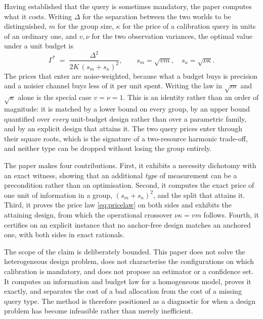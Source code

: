 Having established that the query is sometimes mandatory, the paper computes what it costs.
Writing $\Delta$ for the separation between the two worlds to be distinguished, $m$ for the
group size, $\kappa$ for the price of a calibration query in units of an ordinary one, and
$v,\nu$ for the two observation variances, the optimal value under a unit budget is
\begin{equation}
\Gamma^{*} \;=\; \frac{\Delta^{2}}{2K\,(s_{m}+s_{\kappa})^{2}},
\qquad s_{m}=\sqrt{vm},\quad s_{\kappa}=\sqrt{\nu\kappa} .
\label{eq:pricelaw}
\end{equation}
The prices that enter are noise-weighted, because what a budget buys is precision and a
noisier channel buys less of it per unit spent. Writing the law in $\sqrt{m}$ and
$\sqrt{\kappa}$ alone is the special case $v=\nu=1$.
This is an identity rather than an order of magnitude: it is matched by a lower bound on
every group, by an upper bound quantified over \emph{every} unit-budget design rather than
over a parametric family, and by an explicit design that attains it. The two query prices
enter through their square roots, which is the signature of a two-resource harmonic
trade-off, and neither type can be dropped without losing the group entirely.

The paper makes four contributions. First, it exhibits a necessity dichotomy with an exact
witness, showing that an additional \emph{type} of measurement can be a precondition rather
than an optimisation. Second, it computes the exact price of one unit of information in a
group, $(s_{m}+s_{\kappa})^{2}$, and the split that attains it. Third, it proves the
price law \eqref{eq:pricelaw} on both sides and exhibits the attaining design, from which
the operational crossover $\nu\kappa=vm$ follows. Fourth, it certifies on an explicit instance
that no anchor-free design matches an anchored one, with both sides in exact rationals.

The scope of the claim is deliberately bounded. This paper does not solve the heterogeneous
design problem, does not characterise the configurations on which calibration is mandatory,
and does not propose an estimator or a confidence set. It computes an information and
budget law for a homogeneous model, proves it exactly, and separates the cost of a bad
allocation from the cost of a missing query type. The method is therefore positioned as a
diagnostic for when a design problem has become infeasible rather than merely inefficient.

